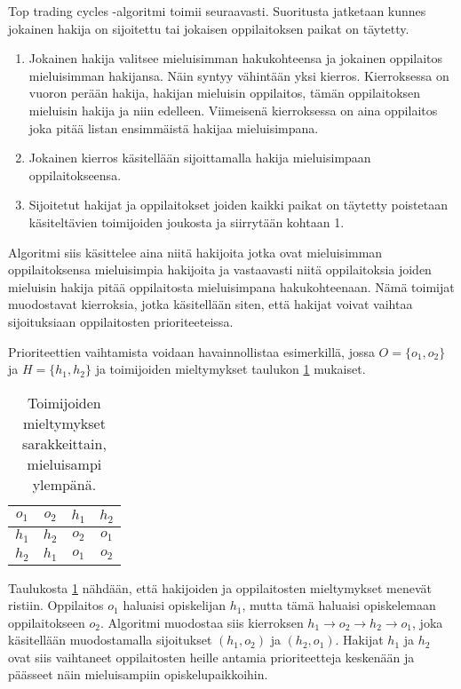 \documentclass[gradu, twoside]{tktltiki}
\begin{document}
Top trading cycles -algoritmi toimii seuraavasti. Suoritusta jatketaan
kunnes jokainen hakija on sijoitettu tai jokaisen oppilaitoksen paikat
on täytetty.
\begin{enumerate}

\item Jokainen hakija valitsee mieluisimman hakukohteensa ja jokainen
  oppilaitos mieluisimman hakijansa. Näin syntyy vähintään yksi
  kierros. Kierroksessa on vuoron perään hakija, hakijan mieluisin
  oppilaitos, tämän oppilaitoksen mieluisin hakija ja niin edelleen.
  Viimeisenä kierroksessa on aina oppilaitos joka pitää listan
  ensimmäistä hakijaa mieluisimpana.

\item Jokainen kierros käsitellään sijoittamalla hakija mieluisimpaan
  oppilaitokseensa.

\item Sijoitetut hakijat ja oppilaitokset joiden kaikki paikat on
  täytetty poistetaan käsiteltävien toimijoiden joukosta ja siirrytään
  kohtaan 1.
\end{enumerate}

Algoritmi siis käsittelee aina niitä hakijoita jotka ovat mieluisimman
oppilaitoksensa mieluisimpia hakijoita ja vastaavasti niitä
oppilaitoksia joiden mieluisin hakija pitää oppilaitosta mieluisimpana
hakukohteenaan. Nämä toimijat muodostavat kierroksia, jotka
käsitellään siten, että hakijat voivat vaihtaa sijoituksiaan
oppilaitosten prioriteeteissa.

Prioriteettien vaihtamista voidaan havainnollistaa esimerkillä, jossa
$O = \{o_1, o_2\}$ ja $H = \{h_1, h_2\}$ ja toimijoiden mieltymykset
taulukon \ref{top_esimerkki} mukaiset.

\begin{table}[ht]
  \begin{center}
    \begin{tabular}{ c c | c c }
    $o_1$ & $o_2$ & $h_1$ & $h_2$ \\
    \hline
    $h_1$ & $h_2$ & $o_2$ & $o_1$ \\
    $h_2$ & $h_1$ & $o_1$ & $o_2$
    \end{tabular}
    \caption{Toimijoiden mieltymykset sarakkeittain, mieluisampi ylempänä.}
    \label{top_esimerkki}
  \end{center}
\end{table}

Taulukosta \ref{top_esimerkki} nähdään, että hakijoiden ja
oppilaitosten mieltymykset menevät ristiin. Oppilaitos $o_1$ haluaisi
opiskelijan $h_1$, mutta tämä haluaisi opiskelemaan oppilaitokseen
$o_2$. Algoritmi muodostaa siis kierroksen $h_1 \rightarrow o_2
\rightarrow h_2 \rightarrow o_1$, joka käsitellään muodostamalla
sijoitukset $(h_1, o_2)$ ja $(h_2, o_1)$. Hakijat $h_1$ ja $h_2$ ovat
siis vaihtaneet oppilaitosten heille antamia prioriteetteja keskenään
ja päässeet näin mieluisampiin opiskelupaikkoihin.
\end{document}

